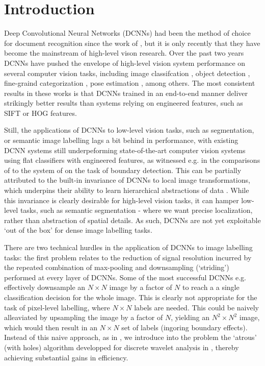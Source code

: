 \section{Introduction}
\label{sec:intro}
Deep Convolutional Neural Networks (DCNNs) had been the method of choice for document recognition since the work of \citet{LeCun1998}, but 
it is only recently that they have become the mainstream of high-level vison research.
Over the past two years  DCNNs have pushed the envelope of high-level vision system performance on several computer vision tasks, including image classifcation \citet{KrizhevskyNIPS2013, papandreou2014untangling, sermanet2013overfeat, simonyan2014very, szegedy2014going}, object detection \citet{girshick2014rcnn}, fine-graind categorization \citet{zhang2014part}, pose estimation \citet{chen2014articulated, tompson2014joint}, among others.
The most consistent results in these works is that DCNNs trained in an end-to-end manner  deliver  strikingly better results than systems relying on engineered features, such as SIFT or HOG features.

Still, the applications of DCNNs to low-level vision tasks, such as segmentation, or semantic image labelling  lags a bit behind in performance, with existing DCNN systems still underpeforming  state-of-the-art  computer vision systems using flat classifiers with engineered features, as witnessed e.g. in the comparisons of \cite{williams14} to the system of \cite{DollarZ13} on the task of boundary detection. 
 This can be partially attributed to the built-in  invariance of DCNNs to local image transformations, which underpins their ability to learn hierarchical abstractions of data \citep{zeiler2014visualizing}.
While this invariance is clearly desirable for high-level vision tasks, it can hamper low-level tasks, such as semantic segmentation - where we want precise localization, rather than abstraction of spatial details.  As such, DCNNs are not yet exploitable `out of the box' for dense image labelling tasks. 

There are two technical hurdles in the application of DCNNs to image labelling tasks: the first problem relates to the reduction of signal resolution incurred by the repeated combination of max-pooling and downsampling (`striding') performed at every layer of DCNNs.  Some of the most successful  DCNNs e.g. 
\citep{KrizhevskyNIPS2013, simonyan2014very, szegedy2014going}
effectively downsample an $N\times N$ image by a factor of $N$ to reach a 
a single  classification decision for the whole image. This is clearly not appropriate for the task of pixel-level labelling, where $N \times N$ labels are needed. This could  be naively alleaviated by upsampling the image by a factor of $N$, yielding an $N^2\times N^2$ image, which would then result in an $N\times N$ set of labels (ingoring boundary effects). Instead of this naive approach, as in  \cite{papandreou2014untangling}, we introduce into the problem the `atrous' (with holes) algorithm developped for  discrete wavelet analysis in  \cite{Mall99}, thereby achieving substantial gains in efficiency. 

